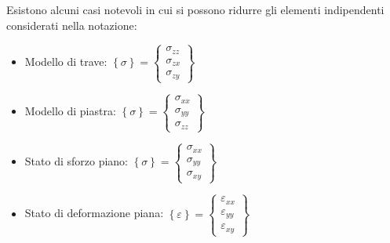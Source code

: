 Esistono alcuni casi notevoli in cui si possono ridurre gli elementi indipendenti considerati nella notazione:
\begin{itemize}
    \item Modello di trave: 
    $\left\{\sigma\right\} = \left\{
    \begin{array}{c}
    \sigma_{zz} \\ \sigma_{zx} \\ \sigma_{zy}
    \end{array}
    \right\}$

    \item Modello di piastra: 
    $\left\{\sigma\right\} = \left\{
    \begin{array}{c}
    \sigma_{xx} \\ \sigma_{yy} \\ \sigma_{zz}
    \end{array}
    \right\}$

    \item Stato di sforzo piano: 
    $\left\{\sigma\right\} = \left\{
    \begin{array}{c}
    \sigma_{xx} \\ \sigma_{yy} \\ \sigma_{xy}
    \end{array}
    \right\}$

    \item Stato di deformazione piana: 
    $\left\{\varepsilon\right\} = \left\{
    \begin{array}{c}
    \varepsilon_{xx} \\ \varepsilon_{yy} \\ \varepsilon_{xy}
    \end{array}
    \right\}$
\end{itemize}





